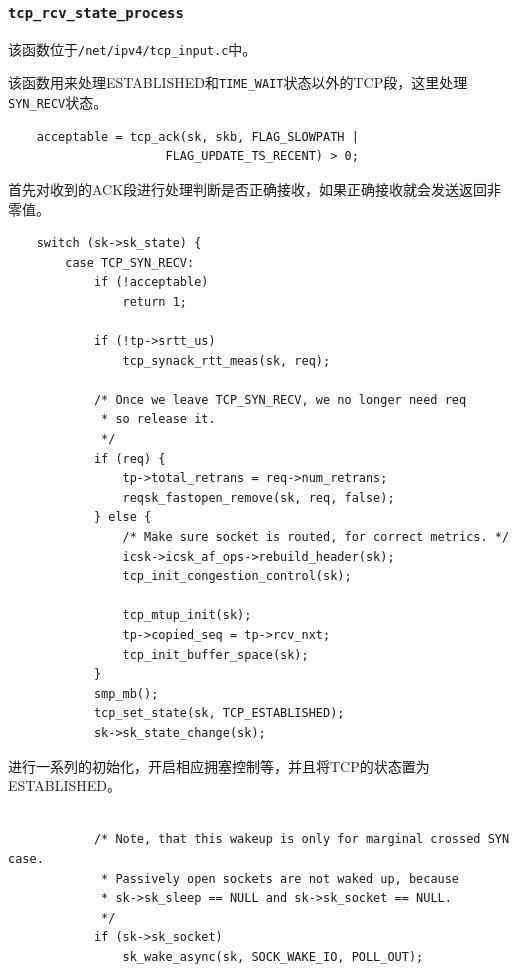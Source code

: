                 \subsubsection{\texttt{tcp_rcv_state_process}}

                    该函数位于\texttt{/net/ipv4/tcp_input.c}中。
                    
                    该函数用来处理ESTABLISHED和\texttt{TIME_WAIT}状态以外的TCP段，这里处理\texttt{SYN_RECV}状态。

\begin{verbatim}
    acceptable = tcp_ack(sk, skb, FLAG_SLOWPATH |
                      FLAG_UPDATE_TS_RECENT) > 0;
\end{verbatim}

                    首先对收到的ACK段进行处理判断是否正确接收，如果正确接收就会发送返回非零值。

\begin{verbatim}
    switch (sk->sk_state) {
        case TCP_SYN_RECV:
            if (!acceptable)
                return 1;

            if (!tp->srtt_us)
                tcp_synack_rtt_meas(sk, req);

            /* Once we leave TCP_SYN_RECV, we no longer need req
             * so release it.
             */
            if (req) {
                tp->total_retrans = req->num_retrans;
                reqsk_fastopen_remove(sk, req, false);
            } else {
                /* Make sure socket is routed, for correct metrics. */
                icsk->icsk_af_ops->rebuild_header(sk);
                tcp_init_congestion_control(sk);

                tcp_mtup_init(sk);
                tp->copied_seq = tp->rcv_nxt;
                tcp_init_buffer_space(sk);
            }
            smp_mb();
            tcp_set_state(sk, TCP_ESTABLISHED);
            sk->sk_state_change(sk);
\end{verbatim}

                    进行一系列的初始化，开启相应拥塞控制等，并且将TCP的状态置为ESTABLISHED。

\begin{verbatim}

            /* Note, that this wakeup is only for marginal crossed SYN case.
             * Passively open sockets are not waked up, because
             * sk->sk_sleep == NULL and sk->sk_socket == NULL.
             */
            if (sk->sk_socket)
                sk_wake_async(sk, SOCK_WAKE_IO, POLL_OUT);
\end{verbatim}

